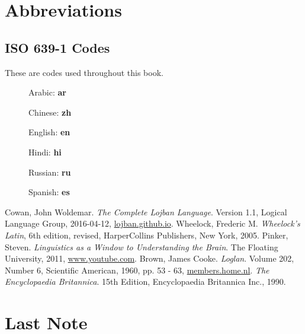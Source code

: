 \documentclass[12pt]{book}
\begin{document}




\chapter{Abbreviations}

\section{ISO 639-1 Codes}

These are codes used throughout this book.

\begin{description}
\item[ ] Arabic: \textbf{ar}
\item[ ] Chinese: \textbf{zh}
\item[ ] English: \textbf{en}
\item[ ] Hindi: \textbf{hi}
\item[ ] Russian: \textbf{ru}
\item[ ] Spanish: \textbf{es}
\end{description}

\begin{thebibliography}{9}
	Cowan, John Woldemar.
	\textit{The Complete Lojban Language}.
	Version 1.1,
	Logical Language Group,
	2016-04-12,
	\href{https://lojban.github.io/cll/}{lojban.github.io}.
	Wheelock, Frederic M.
	\textit{Wheelock's Latin},
	6th edition, revised,
	HarperCollins Publishers, New York,
	2005.
	Pinker, Steven.
	\textit{Linguistics as a Window to Understanding the Brain}.
	The Floating University,
	2011,
	\href{https://www.youtube.com/watch?v=Q-B_ONJIEcE}{www.youtube.com}.
	Brown, James Cooke.
	\textit{Loglan}.
	Volume 202, 
	Number 6, 
	Scientific American,
	1960,
	pp. 53 - 63,
	\href{http://members.home.nl/w.dijkhuis/loglan_jcb/Brown_JC_loglan.html}{members.home.nl}.
	\textit{The Encyclopaedia Britannica}.
	15th Edition,
	Encyclopaedia Britannica Inc.,
	1990.
\end{thebibliography}

\backmatter 

\chapter{Last Note}
\end{document}
